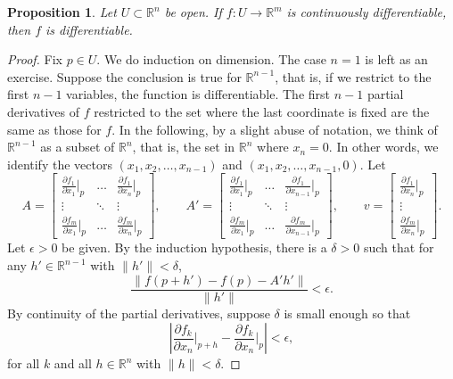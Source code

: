 \documentclass[12pt,openany]{book}
\newcommand{\snorm}[1]{\lVert {#1} \rVert}
\newcommand{\abs}[1]{\left\lvert {#1} \right\rvert}
\newcommand{\R}{{\mathbb{R}}}
\theoremstyle{plain}
\newtheorem{prop}[thm]{Proposition}
\theoremstyle{remark}
\theoremstyle{definition}
\theoremstyle{exercise}
\theoremstyle{example}
\begin{document}
\begin{prop} \label{mv:prop:contdiffpartials}
Let $U \subset \R^n$ be open.
If $f \colon U \to \R^m$ is
continuously differentiable, then
$f$ is differentiable.
\end{prop}

\begin{proof}
Fix $p \in U$.  We do induction on dimension.  The case $n=1$ is left
as an exercise.
Suppose the conclusion is true for $\R^{n-1}$,
that is,
if we restrict to the first $n-1$ variables, the function is differentiable.
The first $n-1$
partial derivatives of $f$ restricted to the set where the last coordinate is
fixed are the same as those for $f$.
In the following, by a slight abuse of notation,
we think of $\R^{n-1}$ as a subset of $\R^n$, that is, the set in $\R^n$ where $x_n = 0$.
In other words, we identify the vectors $(x_1,x_2,\ldots,x_{n-1})$ and
$(x_1,x_2,\ldots,x_{n-1},0)$.
Let
\begin{equation*}
A = 
\begin{bmatrix}
\frac{\partial f_1}{\partial x_1}\big|_p
& \ldots &
\frac{\partial f_1}{\partial x_n}\big|_p
\\
\vdots & \ddots & \vdots
\\
\frac{\partial f_m}{\partial x_1}\big|_p
& \ldots &
\frac{\partial f_m}{\partial x_n}\big|_p
\end{bmatrix} ,
\qquad
A' = 
\begin{bmatrix}
\frac{\partial f_1}{\partial x_1}\big|_p
& \ldots &
\frac{\partial f_1}{\partial x_{n-1}}\big|_p
\\
\vdots & \ddots & \vdots
\\
\frac{\partial f_m}{\partial x_1}\big|_p
& \ldots &
\frac{\partial f_m}{\partial x_{n-1}}\big|_p
\end{bmatrix} ,
\qquad
v = 
\begin{bmatrix}
\frac{\partial f_1}{\partial x_n}\big|_p
\\
\vdots
\\
\frac{\partial f_m}{\partial x_n}\big|_p
\end{bmatrix} .
\end{equation*}
Let $\epsilon > 0$ be given.  By the induction hypothesis, there
is a $\delta > 0$ such that
for any $h' \in \R^{n-1}$ with $\snorm{h'} < \delta$,
\begin{equation*}
\frac{\snorm{f(p+h') - f(p) - A' h'}}{\snorm{h'}} < \epsilon .
\end{equation*}
By continuity of the partial derivatives, suppose $\delta$ is small
enough so that
\begin{equation*}
\abs{\frac{\partial f_k}{\partial x_n}\Big|_{p+h}
      - \frac{\partial f_k}{\partial x_n}\Big|_{p}} < \epsilon ,
\end{equation*}
for all $k$ and all $h \in \R^n$ with $\snorm{h} < \delta$.


\end{proof}
\end{document}
